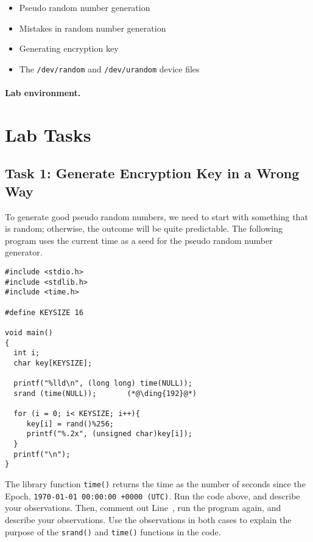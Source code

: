 \begin{itemize}[noitemsep]
\item Pseudo random number generation
\item Mistakes in random number generation
\item Generating encryption key
\item The \texttt{/dev/random} and \texttt{/dev/urandom} device files  
\end{itemize}


\paragraph{Lab environment.}\seedenvironmentC


\section{Lab Tasks}



\subsection{Task 1: Generate Encryption Key in a Wrong Way}

To generate good pseudo random numbers, we need to start with something
that is random; otherwise, the outcome will be quite predictable. 
The following program uses the current time as a seed for the 
pseudo random number generator.


\begin{lstlisting}[caption="Generating a 128-bit encryption key", label=enc:code:key_gen]
#include <stdio.h>
#include <stdlib.h>
#include <time.h>

#define KEYSIZE 16

void main()
{
  int i;
  char key[KEYSIZE];

  printf("%lld\n", (long long) time(NULL));
  srand (time(NULL));       (*@\ding{192}@*)

  for (i = 0; i< KEYSIZE; i++){
     key[i] = rand()%256;
     printf("%.2x", (unsigned char)key[i]);
  }
  printf("\n");
}
\end{lstlisting}
 

The library function \texttt{time()} returns the time as the number of seconds since the Epoch,
\texttt{1970-01-01 00:00:00 +0000 (UTC)}. Run the code above, and describe your
observations. Then, comment out Line~, run the program again, and describe your
observations. Use the observations in both cases to explain the purpose of 
the \texttt{srand()} and \texttt{time()} functions in the code. 




